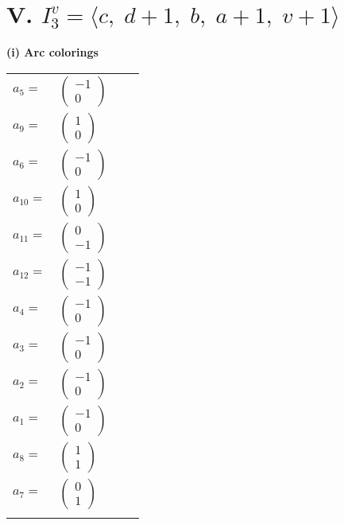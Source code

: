\documentclass[1p]{elsarticle_modified}
\theoremstyle{definition}
\begin{document}
\centering \section*{V. $I^v_{3}= \langle c,\;d+1,\;b,\;a+1,\;v+1 \rangle$}
\flushleft \textbf{(i) Arc colorings}\\
\begin{tabular}{m{7pt} m{180pt} m{7pt} m{180pt} }
\flushright $a_{5}=$&$\begin{pmatrix}-1\\0\end{pmatrix}$ \\
\flushright $a_{9}=$&$\begin{pmatrix}1\\0\end{pmatrix}$ \\
\flushright $a_{6}=$&$\begin{pmatrix}-1\\0\end{pmatrix}$ \\
\flushright $a_{10}=$&$\begin{pmatrix}1\\0\end{pmatrix}$ \\
\flushright $a_{11}=$&$\begin{pmatrix}0\\-1\end{pmatrix}$ \\
\flushright $a_{12}=$&$\begin{pmatrix}-1\\-1\end{pmatrix}$ \\
\flushright $a_{4}=$&$\begin{pmatrix}-1\\0\end{pmatrix}$ \\
\flushright $a_{3}=$&$\begin{pmatrix}-1\\0\end{pmatrix}$ \\
\flushright $a_{2}=$&$\begin{pmatrix}-1\\0\end{pmatrix}$ \\
\flushright $a_{1}=$&$\begin{pmatrix}-1\\0\end{pmatrix}$ \\
\flushright $a_{8}=$&$\begin{pmatrix}1\\1\end{pmatrix}$ \\
\flushright $a_{7}=$&$\begin{pmatrix}0\\1\end{pmatrix}$\\&\end{tabular}
\end{document}
